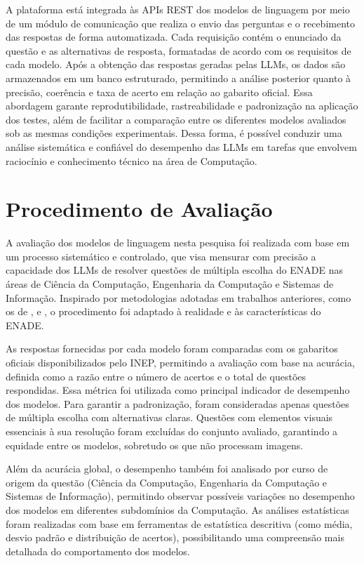 A plataforma está integrada às APIs REST dos modelos de linguagem por meio de um módulo de comunicação que realiza o envio das perguntas e o recebimento das respostas de forma automatizada. Cada requisição contém o enunciado da questão e as alternativas de resposta, formatadas de acordo com os requisitos de cada modelo. Após a obtenção das respostas geradas pelas LLMs, os dados são armazenados em um banco estruturado, permitindo a análise posterior quanto à precisão, coerência e taxa de acerto em relação ao gabarito oficial. Essa abordagem garante reprodutibilidade, rastreabilidade e padronização na aplicação dos testes, além de facilitar a comparação entre os diferentes modelos avaliados sob as mesmas condições experimentais. Dessa forma, é possível conduzir uma análise sistemática e confiável do desempenho das LLMs em tarefas que envolvem raciocínio e conhecimento técnico na área de Computação.

\section{Procedimento de Avaliação }

A avaliação dos modelos de linguagem nesta pesquisa foi realizada com base em um processo sistemático e controlado, que visa mensurar com precisão a capacidade dos LLMs de resolver questões de múltipla escolha do ENADE nas áreas de Ciência da Computação, Engenharia da Computação e Sistemas de Informação. Inspirado por metodologias adotadas em trabalhos anteriores, como os de \textcite{nunes2023evaluating}, \textcite{viegas2024avaliando} e \textcite{raposo2024avaliaccao}, o procedimento foi adaptado à realidade e às características do ENADE.

As respostas fornecidas por cada modelo foram comparadas com os gabaritos oficiais disponibilizados pelo INEP, permitindo a avaliação com base na acurácia, definida como a razão entre o número de acertos e o total de questões respondidas. Essa métrica foi utilizada como principal indicador de desempenho dos modelos. Para garantir a padronização, foram consideradas apenas questões de múltipla escolha com alternativas claras. Questões com elementos visuais essenciais à sua resolução foram excluídas do conjunto avaliado, garantindo a equidade entre os modelos, sobretudo os que não processam imagens.

Além da acurácia global, o desempenho também foi analisado por curso de origem da questão (Ciência da Computação, Engenharia da Computação e Sistemas de Informação), permitindo observar possíveis variações no desempenho dos modelos em diferentes subdomínios da Computação. As análises estatísticas foram realizadas com base em ferramentas de estatística descritiva (como média, desvio padrão e distribuição de acertos), possibilitando uma compreensão mais detalhada do comportamento dos modelos.

